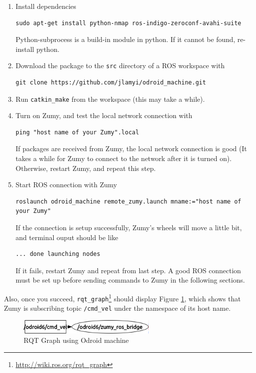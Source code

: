 \documentclass{article}
\begin{document}
\begin{enumerate}
\item Install dependencies
\begin{Verbatim}[frame=single]
sudo apt-get install python-nmap ros-indigo-zeroconf-avahi-suite
\end{Verbatim}
Python-subprocess is a build-in module in python. If it cannot be found, re-install python.
\item Download the package to the \verb=src= directory of a ROS workspace with
\begin{Verbatim}[frame=single]
git clone https://github.com/jlamyi/odroid_machine.git
\end{Verbatim}
\item Run \verb=catkin_make= from the workspace (this may take a while).
\item Turn on Zumy, and test the local network connection with
\begin{Verbatim}[frame=single]
ping "host name of your Zumy".local
\end{Verbatim} 
If packages are received from Zumy, the local network connection is good (It takes a while for Zumy to connect to the network after it is turned on). Otherwise, restart Zumy, and repeat this step.
\item Start ROS connection with Zumy
\begin{Verbatim}[frame=single]
roslaunch odroid_machine remote_zumy.launch mname:="host name of your Zumy"
\end{Verbatim}
If the connection is setup successfully, Zumy's wheels will move a little bit, and terminal ouput should be like
\begin{Verbatim}[frame=single]
... done launching nodes
\end{Verbatim}
If it fails, restart Zumy and repeat from last step. A good ROS connection must be set up before sending commands to Zumy in the following sections. 
\end{enumerate}
Also, once you succeed, \verb=rqt_graph=\footnote{\url{http://wiki.ros.org/rqt_graph}} should display Figure \ref{fig:rqt_graph}, which shows that Zumy is subscribing topic \verb=/cmd_vel= under the namespace of its host name. 
\begin{figure}[h]
\centering
\includegraphics[width=0.6\textwidth]{img/rosgraph.png}
\caption{RQT Graph using Odroid machine}
\label{fig:rqt_graph}
\end{figure}
\end{document}
